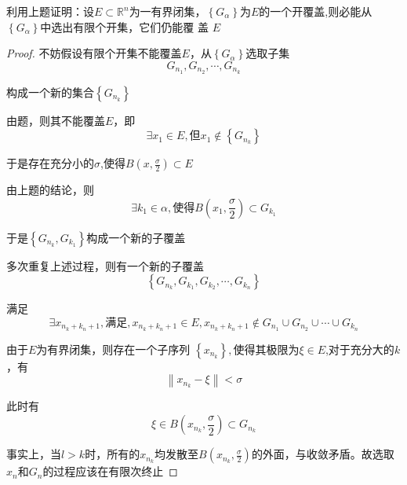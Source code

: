 \documentclass[lang=cn,10pt]{elegantbook}
\begin{document}
\begin{exercise}
	利用上题证明：设$E\subset \mathbb{R} ^n$为一有界闭集，$\left\{ G_{\alpha} \right\} \text{为}E\text{的一个开覆盖}$,则必能从$\left\{ G_{\alpha} \right\}$中选出有限个开集，它们仍能覆
	盖 $E$
\end{exercise}
\begin{proof}
	
	不妨假设有限个开集不能覆盖$E$，从$\left\{ G_{\alpha} \right\}$选取子集
	\begin{equation*}
		G_{n_1},G_{n_2},\cdots ,G_{n_k}
	\end{equation*}
	
	构成一个新的集合$\left\{ G_{n_{k}} \right\}$
	
	由题，则其不能覆盖$E$，即
	\begin{equation*}
		\exists x_{1} \in E,\text{但}x_{1}\notin \left\{ G_{n_{k}} \right\}
	\end{equation*}
	
	于是存在充分小的$\sigma$,使得$B(x,\frac{\sigma}{2})\subset E$
	
	由上题的结论，则
	\begin{equation*}
		\exists k_{1}\in \alpha,\text{使得}B(x_{1},\frac{\sigma}{2})\subset G_{k_{1}}
	\end{equation*}
	
	于是$\left\{ G_{n_{k}},G_{k_{1}} \right\}$构成一个新的子覆盖
	
	多次重复上述过程，则有一个新的子覆盖
	\begin{equation*}
		\left\{ G_{n_k},G_{k_1},G_{k_2},\cdots ,G_{k_n} \right\} 
	\end{equation*}
	
	满足
	\begin{equation*}
		\exists x_{n_{k}+k_{n}+1},\text{满足},x_{n_{k}+k_{n}+1}\in E,x_{n_{k}+k_{n}+1}\notin G_{n_1}\cup G_{n_2}\cup \cdots \cup G_{k_n}
	\end{equation*}
	
	由于$E$为有界闭集，则存在一个子序列		$\left\{ x_{n_{k}} \right\} ,\text{使得其极限为}\xi \in E$,对于充分大的$k$，有
	\begin{equation*}
		\left\| x_{n_k}-\xi \right\| <\sigma 
	\end{equation*}
	
	此时有
	\begin{equation*}
		\xi\in B(x_{n_{k}},\frac{\sigma}{2})\subset G_{n_{k}}
	\end{equation*}

	事实上，当$l>k$时，所有的$x_{n_{k}}$均发散至$B(x_{n_{k}},\frac{\sigma}{2})$的外面，与收敛矛盾。故选取$x_{n}$和$G_{n}$的过程应该在有限次终止
\end{proof}
\end{document}
